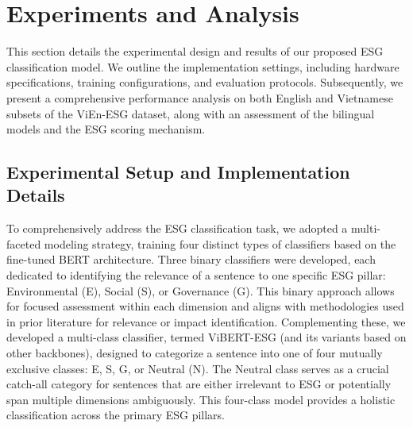 \documentclass[12pt, letterpaper]{template}
\begin{document}
{{{%



\section{Experiments and Analysis}\label{exp}

This section details the experimental design and results of our proposed ESG classification model. We outline the implementation settings, including hardware specifications, training configurations, and evaluation protocols. Subsequently, we present a comprehensive performance analysis on both English and Vietnamese subsets of the ViEn-ESG dataset, along with an assessment of the bilingual models and the ESG scoring mechanism.

\subsection{Experimental Setup and Implementation Details}

To comprehensively address the ESG classification task, we adopted a multi-faceted modeling strategy, training four distinct types of classifiers based on the fine-tuned BERT architecture. Three binary classifiers were developed, each dedicated to identifying the relevance of a sentence to one specific ESG pillar: Environmental (E), Social (S), or Governance (G). This binary approach allows for focused assessment within each dimension and aligns with methodologies used in prior literature for relevance or impact identification. Complementing these, we developed a multi-class classifier, termed ViBERT-ESG (and its variants based on other backbones), designed to categorize a sentence into one of four mutually exclusive classes: E, S, G, or Neutral (N). The Neutral class serves as a crucial catch-all category for sentences that are either irrelevant to ESG or potentially span multiple dimensions ambiguously. This four-class model provides a holistic classification across the primary ESG pillars.

}}}
\end{document}

